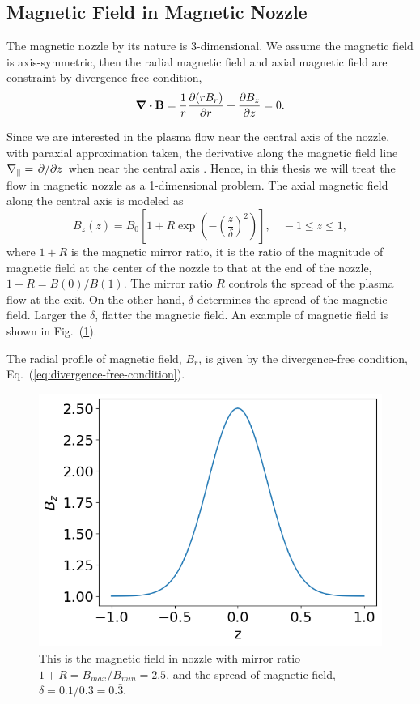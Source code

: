 \subsection{Magnetic Field in Magnetic Nozzle} \label{sec:magnetic-field-in-nozzle}
The magnetic nozzle by its nature is 3-dimensional. We assume the magnetic field is axis-symmetric, then the radial magnetic field and axial magnetic field are constraint by divergence-free condition,
\begin{equation}
	\div\mathbf{B} = \frac{1}{r}\pdv{(rB_r)}{r} + \pdv{B_z}{z} = 0.
	\label{eq:divergence-free-condition}
\end{equation}

Since we are interested in the plasma flow near the central axis of the nozzle, with paraxial approximation taken, the derivative along the magnetic field line $\nabla_\parallel = \pdv*{z}$ when near the central axis \cite{smolyakov_quasineutral_2021}. Hence, in this thesis we will treat the flow in magnetic nozzle as a 1-dimensional problem. The axial magnetic field along the central axis is modeled as
\begin{equation}
	B_z(z) = B_0 \left[1 + R\exp(-\left(\frac{z}{\delta}\right)^2)\right], \quad -1\leq z \leq 1,
\end{equation}
where $1+R$ is the magnetic mirror ratio, it is the ratio of the magnitude of magnetic field at the center of the nozzle to that at the end of the nozzle, $1+R = B(0)/B(1)$. The mirror ratio $R$ controls the spread of the plasma flow at the exit. On the other hand, $\delta$ determines the spread of the magnetic field. Larger the $\delta$, flatter the magnetic field. An example of magnetic field is shown in Fig.~(\ref{fig:magnetic-field}).

The radial profile of magnetic field, $B_r$, is given by the divergence-free condition, Eq.~(\ref{eq:divergence-free-condition}).

\begin{figure}[htbp]
	\centering
	\includegraphics[width=0.7\linewidth]{figures/magnetic-field}
	\caption{This is the magnetic field in nozzle with mirror ratio $1+R=B_{max}/B_{min}=2.5$, and the spread of magnetic field, $\delta=0.1/0.3=0.\bar{3}$. }
	\label{fig:magnetic-field}
\end{figure}

